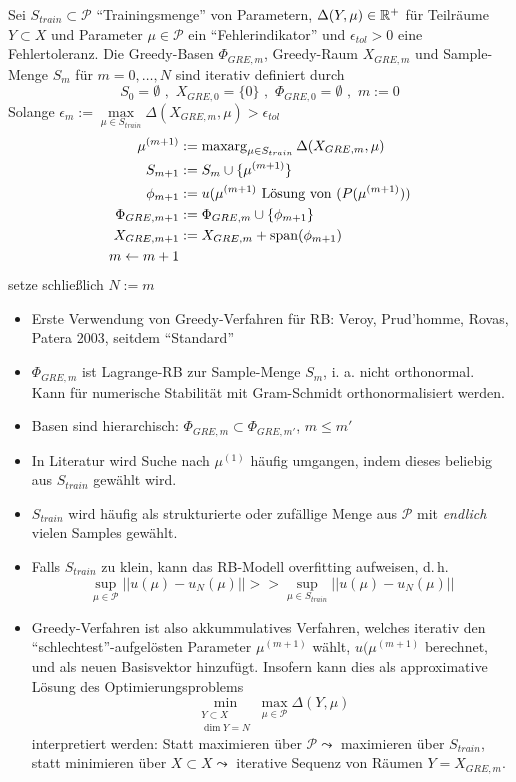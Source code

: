\begin{defn}
	Sei $S_{train} \subset \mathcal{P}$ ``Trainingsmenge'' von Parametern, $\Delta (Y,\mu) \in \mathbb{R}^+$ für Teilräume $Y \subset X$ und Parameter $\mu \in \mathcal{P}$ ein ``Fehlerindikator'' und $\epsilon_{tol} > 0$ eine Fehlertoleranz. Die Greedy-Basen $\Phi_{GRE,m}$, Greedy-Raum $X_{GRE,m}$ und Sample-Menge $S_m$ für $m=0,\dots,N$ sind iterativ definiert durch
	\[
		S_0 = \emptyset \,\, , \,\, X_{GRE,0} = \{0\} \,\, , \,\, \Phi_{GRE,0} = \emptyset \,\, , \,\, m:=0
	\]
Solange $\epsilon_m := \max\limits_{\mu \in S_{train}} \Delta(X_{GRE,m},\mu) > \epsilon_{tol}$
\begin{align*}
	\mu^{(m+1)} &:= \op{max arg}\limits_{\mu \in S_{train}} \Delta(X_{GRE,m},\mu) \\
	S_{m+1} &:= S_m \cup \{\mu^{(m+1)}\} \\
	\phi_{m+1} &:= u(\mu^{(m+1)} \text{ Lösung von } (P(\mu^{(m+1)})) \\
	\Phi_{GRE,m+1} &:= \Phi_{GRE,m} \cup \{\phi_{m+1}\} \\
	X_{GRE,m+1} &:= X_{GRE,m} + \op{span}(\phi_{m+1}) \\
	m \leftarrow m+1
\end{align*}
setze schließlich $N:=m$
\end{defn}

\begin{bem} \beginwithlistbem
	\begin{itemize}
		\item Erste  Verwendung von Greedy-Verfahren für RB: Veroy, Prud'homme, Rovas, Patera 2003, seitdem ``Standard''
		\item $\Phi_{GRE,m}$ ist Lagrange-RB zur Sample-Menge $S_m$, i. a. nicht orthonormal. Kann für numerische Stabilität mit Gram-Schmidt orthonormalisiert werden.
		\item Basen sind hierarchisch: $\Phi_{GRE,m} \subset \Phi_{GRE,m'}$, $m \leq m'$
		\item In Literatur wird Suche nach $\mu^{(1)}$ häufig umgangen, indem dieses beliebig aus $S_{train}$ gewählt wird.
		\item $S_{train}$ wird häufig als strukturierte oder zufällige Menge aus $\mathcal{P}$ mit \emph{endlich} vielen Samples gewählt.
		\item Falls $S_{train}$ zu klein, kann das RB-Modell overfitting aufweisen, d.\,h.
		\[
			\sup\limits_{\mu \in \mathcal{P}} || u(\mu) - u_N(\mu) || >> \sup\limits_{\mu \in S_{train}} || u(\mu) - u_N(\mu) ||
		\]
		\item Greedy-Verfahren ist also akkummulatives Verfahren, welches iterativ den ``schlechtest''-aufgelösten Parameter $\mu^{(m+1)}$ wählt, $u(\mu^{(m+1)}$ berechnet, und als neuen Basisvektor hinzufügt. Insofern kann dies als approximative Lösung des Optimierungsproblems
		\[
			\min\limits_{\substack{Y \subset X \\ \dim Y = N}} \max\limits_{\mu \in \mathcal{P}} \Delta (Y,\mu)
		\]
	interpretiert werden: Statt maximieren über $\mathcal{P} \leadsto	$ maximieren über $S_{train}$, statt minimieren über $X \subset X \leadsto$ iterative Sequenz von Räumen $Y = X_{GRE,m}$.
	\end{itemize}
\end{bem}

